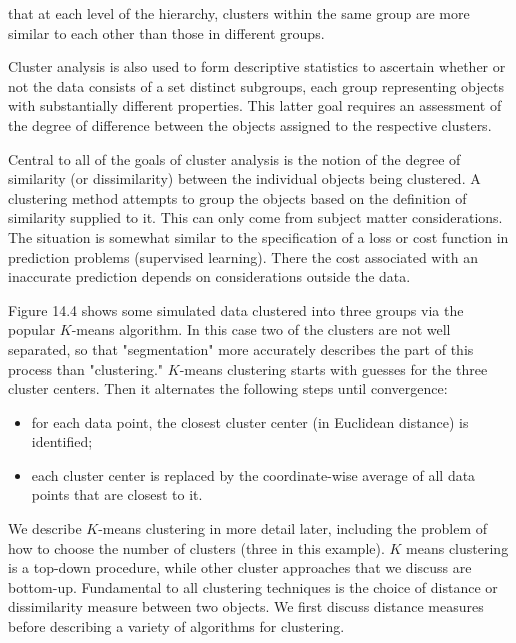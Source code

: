\documentclass[10pt]{article}
\begin{document}
that at each level of the hierarchy, clusters within the same group are more similar to each other than those in different groups.

Cluster analysis is also used to form descriptive statistics to ascertain whether or not the data consists of a set distinct subgroups, each group representing objects with substantially different properties. This latter goal requires an assessment of the degree of difference between the objects assigned to the respective clusters.

Central to all of the goals of cluster analysis is the notion of the degree of similarity (or dissimilarity) between the individual objects being clustered. A clustering method attempts to group the objects based on the definition of similarity supplied to it. This can only come from subject matter considerations. The situation is somewhat similar to the specification of a loss or cost function in prediction problems (supervised learning). There the cost associated with an inaccurate prediction depends on considerations outside the data.

Figure 14.4 shows some simulated data clustered into three groups via the popular $K$-means algorithm. In this case two of the clusters are not well separated, so that "segmentation" more accurately describes the part of this process than "clustering." $K$-means clustering starts with guesses for the three cluster centers. Then it alternates the following steps until convergence:

\begin{itemize}
  \item for each data point, the closest cluster center (in Euclidean distance) is identified;
  \item each cluster center is replaced by the coordinate-wise average of all data points that are closest to it.
\end{itemize}

We describe $K$-means clustering in more detail later, including the problem of how to choose the number of clusters (three in this example). $K$ means clustering is a top-down procedure, while other cluster approaches that we discuss are bottom-up. Fundamental to all clustering techniques is the choice of distance or dissimilarity measure between two objects. We first discuss distance measures before describing a variety of algorithms for clustering.
\end{document}
